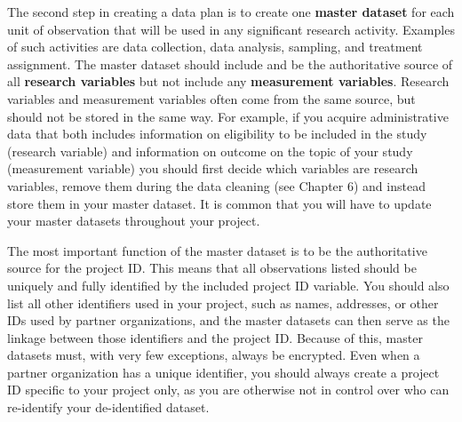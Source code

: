 The second step in creating a data plan is to create one \textbf{master dataset} 
for each unit of observation
that will be used in any significant research activity.
Examples of such activities are data collection, data analysis, 
sampling, and treatment assignment.
The master dataset should include and be the authoritative source of
all \textbf{research variables} 
but not include any \textbf{measurement variables}.
Research variables and measurement variables 
often come from the same source,
but should not be stored in the same way.
For example, if you acquire administrative data that both includes 
information on eligibility to be included in the study (research variable) 
and information on outcome on the topic of your study (measurement variable) 
you should first decide which variables are research variables, 
remove them during the data cleaning (see Chapter 6) 
and instead store them in your master dataset. 
It is common that you will have to update 
your master datasets throughout your project.

The most important function of the master dataset 
is to be the authoritative source for the project ID.
This means that all observations listed 
should be uniquely and fully identified by the included project ID variable.
You should also list all other identifiers used in your project, 
such as names, addresses, or other IDs used by partner organizations,
and the master datasets can then serve as 
the linkage between those identifiers and the project ID.
Because of this, master datasets must, 
with very few exceptions, always be encrypted.
Even when a partner organization has a unique identifier, 
you should always create a project ID specific to your project only, 
as you are otherwise not in control over 
who can re-identify your de-identified dataset. 

